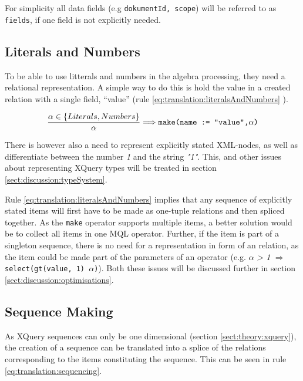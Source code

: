 For simplicity all data fields (e.g \texttt{dokumentId, scope}) will be
referred to as \verb!fields!, if one field is not explicitly needed.

\subsection{Literals and Numbers}
\label{sect:translation:litAndNumbers}
To be able to use litterals and numbers in the algebra processing, they need a
relational representation. A simple way to do this is hold the value in a
created relation with a single field, ``value'' (rule
\ref{eq:translation:literalsAndNumbers} ).

\begin{equation}
\centering
\frac{\alpha \in \left\{ Literals, Numbers \right\} }{\alpha}
\Longrightarrow
\texttt{make(name := "value",} \alpha \texttt{)}
\label{eq:translation:literalsAndNumbers}
\end{equation}

There is however also a need to represent explicitly stated XML-nodes, as well
as differentiate between the number \textit{1} and the string \textit{"1"}.
This, and other issues about representing XQuery types will be treated in
section \ref{sect:discussion:typeSystem}.

Rule \ref{eq:translation:literalsAndNumbers} implies that any sequence of
explicitly stated items will first have to be made as one-tuple relations and
then spliced together. As the \texttt{make} operator supports multiple items, a
better solution would be to collect all items in one MQL operator. Further, if
the item is part of a singleton sequence, there is no need for a representation
in form of an relation, as the item could be made part of the parameters of an
operator (e.g. $\alpha$ \textit{> 1} $\Longrightarrow$
\texttt{select(gt(value, 1) $\alpha$)}). Both these issues will be discussed
further in section \ref{sect:discussion:optimisations}.



\subsection{Sequence Making}
\label{sect:translation:sequencing}
As XQuery sequences can only be one dimensional (section
\ref{sect:theory:xquery}), the creation of a sequence can be translated into a
splice of the relations corresponding to the items constituting the sequence.
This can be seen in rule \ref{eq:translation:sequencing}. 

